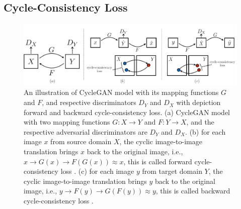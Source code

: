 


\subsection{Cycle-Consistency Loss}\label{CycleConsistencyLoss}

\begin{figure}[H]
	    \begin{center} \includegraphics[scale=0.53]{images/Methodology/CycleGAN.jpg}
	    \caption[An illustration of \ac{CycleGAN} model with its mapping functions $G$ and $F$, and respective discriminators $D_Y$ and $D_X$ with depiction forward and backward cycle-consistency loss.]{An illustration of \ac{CycleGAN} model with its mapping functions $G$ and $F$, and respective discriminators $D_Y$ and $D_X$ with depiction forward and backward cycle-consistency loss. (a) \ac{CycleGAN} model with two mapping functions $G : X \rightarrow Y$ and $F : Y \rightarrow X$, and the respective adversarial discriminators are $D_Y$ and $D_X$. (b) for each image $x$ from source domain $X$, the cyclic image-to-image translation brings $x$ back to the original image, i.e., $x \rightarrow G(x) \rightarrow F(G(x)) \approx x$, this is called forward cycle-consistency loss \cite{zhu2020unpaired}. (c) for each image $y$ from target domain $Y$, the cyclic image-to-image translation brings $y$ back to the original image, i.e., $y \rightarrow F(y) \rightarrow G(F(y)) \approx y$, this is called backward cycle-consistency loss \cite{zhu2020unpaired}.}
	    \label{fig:CycleGAN}
	    \end{center}
\end{figure}


